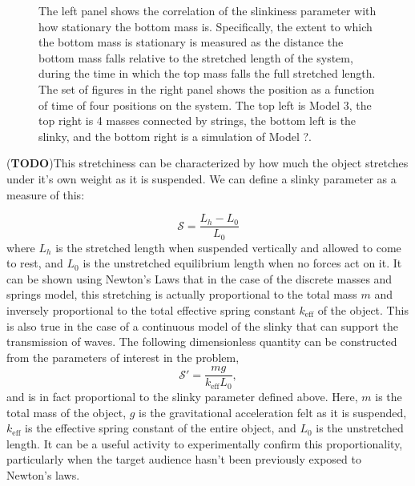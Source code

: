 \documentclass[prb,preprint,superscriptaddress]{revtex4-1}
\newcommand{\TODO}[1]{\marginpar{\raggedright\scriptsize\textbf{TODO:} #1} (\textbf{TODO})}
\begin{document}
\begin{figure}[t!]
\begin{tabular}{cccc}
  \end{tabular}

  \caption{The left panel shows the correlation of the slinkiness parameter with
           how stationary the bottom mass is. Specifically, the extent to which the
           bottom mass is stationary is measured as the distance the bottom mass falls
           relative to the stretched length of the system, during the time in which
           the top mass falls the full stretched length. The set of figures in the
           right panel shows the position as a function of time of four positions
           on the system. The top left is Model 3, the top right is 4 masses connected
           by strings, the bottom left is the slinky, and the bottom right is a
           simulation of Model ?.}
  \label{fig:discretemodel}
\end{figure}

\TODO{Motivate this definition.}This stretchiness can be characterized by how much the object stretches
under it's own weight as it is suspended.   We can define a slinky parameter as a measure of this:

\begin{equation}
\mathcal{S}=\frac{L_h-L_0}{L_0}
\end{equation}
where $L_h$ is the stretched length when suspended vertically and allowed to come to rest, and $L_0$ is the unstretched equilibrium length
when no forces act on it.  It can be shown using Newton's Laws that in the case of the discrete masses and springs model,
this stretching is actually proportional to the total mass $m$ and inversely proportional to the total effective spring constant $k_{\text{eff}}$ of the object.
This is also true in the case of a continuous model of the slinky that can support the transmission of waves.  The following dimensionless quantity
can be constructed from the parameters of interest in the problem,
\begin{equation}
\mathcal{S'}=\frac{m g}{k_\text{eff} L_0 },
\end{equation}
 and is in fact proportional to the  slinky parameter defined above.  Here, $m$ is the total mass of the object, $g$ is the gravitational acceleration felt as it is suspended, $k_\text{eff}$ is the effective spring constant of the entire object, and $L_0$ is the unstretched length.  It can be a useful activity to experimentally 
confirm this proportionality, particularly when the target audience hasn't been previously exposed to Newton's laws.
\end{document}
